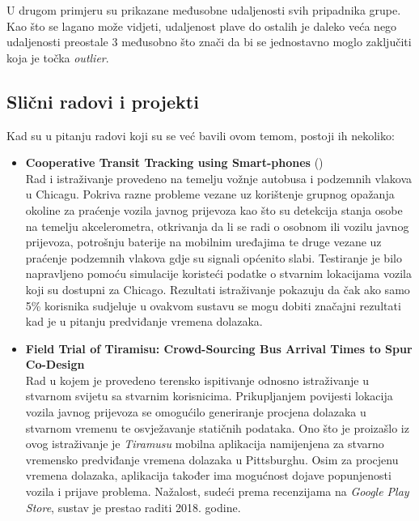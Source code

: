 \documentclass[times, utf8, diplomski]{fer}
\begin{document}
U drugom primjeru su prikazane međusobne udaljenosti svih pripadnika grupe. Kao što se lagano može vidjeti, udaljenost plave do ostalih je daleko veća nego udaljenosti preostale 3 međusobno što znači da bi se jednostavno moglo zaključiti koja je točka \emph{outlier}. 


\subsection{Slični radovi i projekti}
Kad su u pitanju radovi koji su se već bavili ovom temom, postoji ih nekoliko:

\begin{itemize}
    \item \textbf{Cooperative Transit Tracking using Smart-phones} (\cite{chicago_cooptransit_tracking})\\
    Rad i istraživanje provedeno na temelju vožnje autobusa i podzemnih vlakova u Chicagu. Pokriva razne probleme vezane uz korištenje grupnog opažanja okoline za praćenje vozila javnog prijevoza kao što su detekcija stanja osobe na temelju akcelerometra, otkrivanja da li se radi o osobnom ili vozilu javnog prijevoza, potrošnju baterije na mobilnim uređajima te druge vezane uz praćenje podzemnih vlakova gdje su signali općenito slabi. Testiranje je bilo napravljeno pomoću simulacije koristeći podatke o stvarnim lokacijama vozila koji su dostupni za Chicago. Rezultati istraživanje pokazuju da čak ako samo 5\% korisnika sudjeluje u ovakvom sustavu se mogu dobiti značajni rezultati kad je u pitanju predviđanje vremena dolazaka.
    
    \item \textbf{Field Trial of Tiramisu: Crowd-Sourcing Bus Arrival Times to Spur Co-Design} \cite{tiramusu} \\
    Rad u kojem je provedeno terensko ispitivanje odnosno istraživanje u stvarnom svijetu sa stvarnim korisnicima. Prikupljanjem povijesti lokacija vozila javnog prijevoza se omogućilo generiranje procjena dolazaka u stvarnom vremenu te osvježavanje statičnih podataka. Ono što je proizašlo iz ovog istraživanje je \emph{Tiramusu} mobilna aplikacija namijenjena za stvarno vremensko predviđanje vremena dolazaka u Pittsburghu. Osim za procjenu vremena dolazaka, aplikacija također ima mogućnost dojave popunjenosti vozila i prijave problema. Nažalost, sudeći prema recenzijama na \emph{Google Play Store}, sustav je prestao raditi 2018. godine.
\end{itemize}
\end{document}
